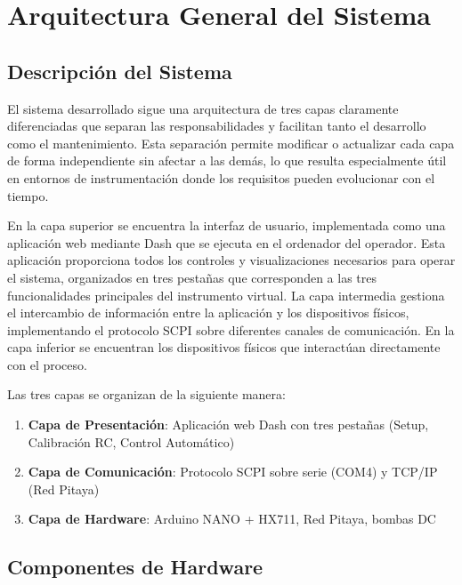 \documentclass[12pt,a4paper]{article}
\begin{document}
\section{Arquitectura General del Sistema}

\subsection{Descripción del Sistema}

El sistema desarrollado sigue una arquitectura de tres capas claramente diferenciadas que separan las responsabilidades y facilitan tanto el desarrollo como el mantenimiento. Esta separación permite modificar o actualizar cada capa de forma independiente sin afectar a las demás, lo que resulta especialmente útil en entornos de instrumentación donde los requisitos pueden evolucionar con el tiempo.

En la capa superior se encuentra la interfaz de usuario, implementada como una aplicación web mediante Dash que se ejecuta en el ordenador del operador. Esta aplicación proporciona todos los controles y visualizaciones necesarios para operar el sistema, organizados en tres pestañas que corresponden a las tres funcionalidades principales del instrumento virtual. La capa intermedia gestiona el intercambio de información entre la aplicación y los dispositivos físicos, implementando el protocolo SCPI sobre diferentes canales de comunicación. En la capa inferior se encuentran los dispositivos físicos que interactúan directamente con el proceso.

Las tres capas se organizan de la siguiente manera:

\begin{enumerate}
    \item \textbf{Capa de Presentación}: Aplicación web Dash con tres pestañas (Setup, Calibración RC, Control Automático)
    \item \textbf{Capa de Comunicación}: Protocolo SCPI sobre serie (COM4) y TCP/IP (Red Pitaya)
    \item \textbf{Capa de Hardware}: Arduino NANO + HX711, Red Pitaya, bombas DC
\end{enumerate}

\subsection{Componentes de Hardware}
\end{document}
